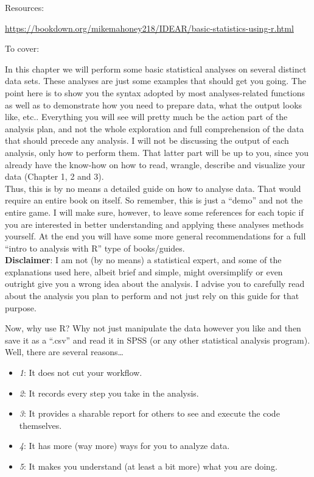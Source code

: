 \documentclass[
]{book}
\begin{document}
Resources:

\url{https://bookdown.org/mikemahoney218/IDEAR/basic-statistics-using-r.html}

To cover:

In this chapter we will perform some basic statistical analyses on several distinct data sets. These analyses are just some examples that should get you going. The point here is to show you the syntax adopted by most analyses-related functions as well as to demonstrate how you need to prepare data, what the output looks like, etc.. Everything you will see will pretty much be the action part of the analysis plan, and not the whole exploration and full comprehension of the data that should precede any analysis. I will not be discussing the output of each analysis, only how to perform them. That latter part will be up to you, since you already have the know-how on how to read, wrangle, describe and visualize your data (Chapter 1, 2 and 3).\\
Thus, this is by no means a detailed guide on how to analyse data. That would require an entire book on itself. So remember, this is just a ``demo'' and not the entire game. I will make sure, however, to leave some references for each topic if you are interested in better understanding and applying these analyses methods yourself. At the end you will have some more general recommendations for a full ``intro to analysis with R'' type of books/guides.\\

\textbf{Disclaimer}: I am not (by no means) a statistical expert, and some of the explanations used here, albeit brief and simple, might oversimplify or even outright give you a wrong idea about the analysis. I advise you to carefully read about the analysis you plan to perform and not just rely on this guide for that purpose.

Now, why use R? Why not just manipulate the data however you like and then save it as a ``.csv'' and read it in SPSS (or any other statistical analysis program). Well, there are several reasons\ldots{}

\begin{itemize}
\item
  \emph{1}: It does not cut your workflow.\\
\item
  \emph{2}: It records every step you take in the analysis.\\
\item
  \emph{3}: It provides a sharable report for others to see and execute the code themselves.\\
\item
  \emph{4}: It has more (way more) ways for you to analyze data.\\
\item
  \emph{5}: It makes you understand (at least a bit more) what you are doing.\\
\end{itemize}
\end{document}

